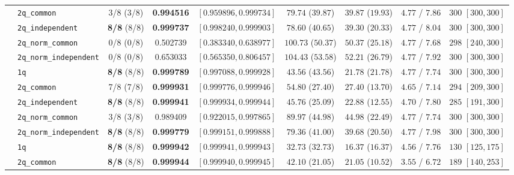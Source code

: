 \documentclass[10pt,a4paper]{article}
\begin{document}
\begin{table}[h!]
{\begin{tabular}{llccccccc}
  & \texttt{2q\_common} & 3/8 (3/8) & \textbf{0.994516} & $[0.959896, 0.999734]$ & $79.74$ ($39.87$) & $39.87$ ($19.93$) & $4.77$ / $7.86$ & $300$ $[300, 300]$ \\
  & \texttt{2q\_independent} & \textbf{8/8} (8/8) & \textbf{0.999737} & $[0.998240, 0.999903]$ & $78.60$ ($40.65$) & $39.30$ ($20.33$) & $4.77$ / $8.04$ & $300$ $[300, 300]$ \\
  & \texttt{2q\_norm\_common} & 0/8 (0/8) & 0.502739 & $[0.383340, 0.638977]$ & $100.73$ ($50.37$) & $50.37$ ($25.18$) & $4.77$ / $7.68$ & $298$ $[240, 300]$ \\
  & \texttt{2q\_norm\_independent} & 0/8 (0/8) & 0.653033 & $[0.565350, 0.806457]$ & $104.43$ ($53.58$) & $52.21$ ($26.79$) & $4.77$ / $7.92$ & $300$ $[300, 300]$ \\
\midrule
  & \texttt{1q} & \textbf{8/8} (8/8) & \textbf{0.999789} & $[0.997088, 0.999928]$ & $43.56$ ($43.56$) & $21.78$ ($21.78$) & $4.77$ / $7.74$ & $300$ $[300, 300]$ \\
  & \texttt{2q\_common} & 7/8 (7/8) & \textbf{0.999931} & $[0.999776, 0.999946]$ & $54.80$ ($27.40$) & $27.40$ ($13.70$) & $4.65$ / $7.14$ & $294$ $[209, 300]$ \\
  & \texttt{2q\_independent} & \textbf{8/8} (8/8) & \textbf{0.999941} & $[0.999934, 0.999944]$ & $45.76$ ($25.09$) & $22.88$ ($12.55$) & $4.70$ / $7.80$ & $285$ $[191, 300]$ \\
  & \texttt{2q\_norm\_common} & 3/8 (3/8) & 0.989409 & $[0.922015, 0.997865]$ & $89.97$ ($44.98$) & $44.98$ ($22.49$) & $4.77$ / $7.74$ & $300$ $[300, 300]$ \\
  & \texttt{2q\_norm\_independent} & \textbf{8/8} (8/8) & \textbf{0.999779} & $[0.999151, 0.999888]$ & $79.36$ ($41.00$) & $39.68$ ($20.50$) & $4.77$ / $7.98$ & $300$ $[300, 300]$ \\
\midrule
  & \texttt{1q} & \textbf{8/8} (8/8) & \textbf{0.999942} & $[0.999941, 0.999943]$ & $32.73$ ($32.73$) & $16.37$ ($16.37$) & $4.56$ / $7.76$ & $130$ $[125, 175]$ \\
  & \texttt{2q\_common} & \textbf{8/8} (8/8) & \textbf{0.999944} & $[0.999940, 0.999945]$ & $42.10$ ($21.05$) & $21.05$ ($10.52$) & $3.55$ / $6.72$ & $189$ $[140, 253]$ \\

\end{tabular}}
\end{table}
\end{document}
